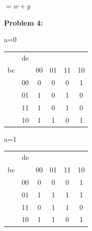 \documentclass{article}
\begin{document}
    \quad\quad\quad\quad $=w+y$

    \quad\quad{}


    \textbf{Problem 4:}



    \begin{center}
        a=0
        \begin{tabular} {cc|cccc}
            & de & &&& \\
            bc && 00 & 01 & 11 & 10 \\
            \hline
            & 00 & 0 & 0 & 0 & 1 \\
            & 01 & 1 & 0 & 1 & 0 \\
            & 11 & 1 & 0 & 1 & 0 \\
            & 10 & 1 & 1 & 0 & 1 \\
        \end{tabular}
        \quad\quad
        a=1
        \begin{tabular} {cc|cccc}
            & de & &&& \\
            bc && 00 & 01 & 11 & 10 \\
            \hline
            & 00 & 0 & 0 & 0 & 1 \\
            & 01 & 1 & 1 & 1 & 1 \\
            & 11 & 0 & 1 & 1 & 0 \\
            & 10 & 1 & 1 & 0 & 1 \\
        \end{tabular}
    \end{center}
\end{document}
